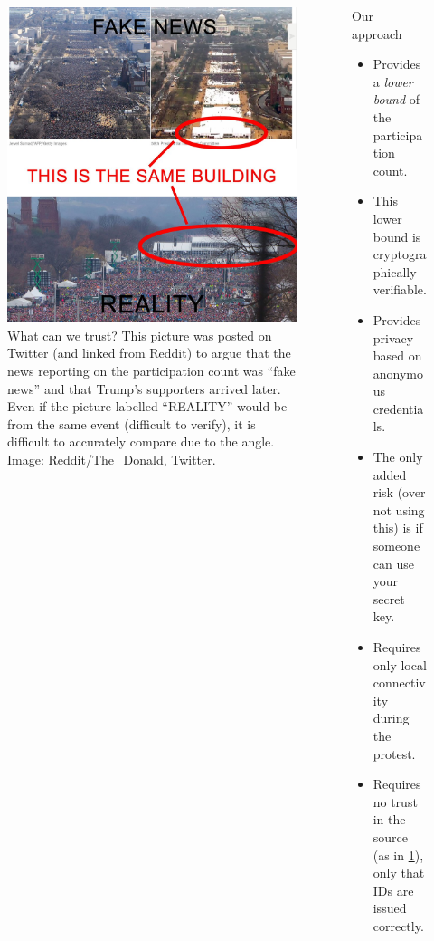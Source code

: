 \begin{columns}[t]
\begin{column}{0.32\linewidth}
    \begin{figure}
      \centering
      \includegraphics[width=0.9\linewidth]{fig/trump.jpg}
      \caption{%
        What can we trust?
        This picture was posted on Twitter (and linked from Reddit) to argue 
        that the news reporting on the participation count was \enquote{fake 
          news} and that Trump's supporters arrived later.
        Even if the picture labelled \enquote{REALITY} would be from the same 
        event (difficult to verify), it is difficult to accurately compare due 
        to the angle.
        Image: Reddit/The\_Donald, Twitter.
      }\label{TrumpInauguration}
    \end{figure}

  \end{column}

  \hfill

  \begin{column}{0.32\linewidth}

    \begin{greenblock}{Our approach}
      \begin{itemize}
        \item Provides a \emph{lower bound} of the participation count.
        \item This lower bound is cryptographically verifiable.
        \item Provides privacy based on anonymous credentials.
        \item The only added risk (over not using this) is if someone can use 
          your secret key.
        \item Requires only local connectivity during the protest.
        \item Requires no trust in the source (as in \cref{TrumpInauguration}), 
          only that IDs are issued correctly.
      \end{itemize}
    \end{greenblock}


\end{column}
\end{columns}
